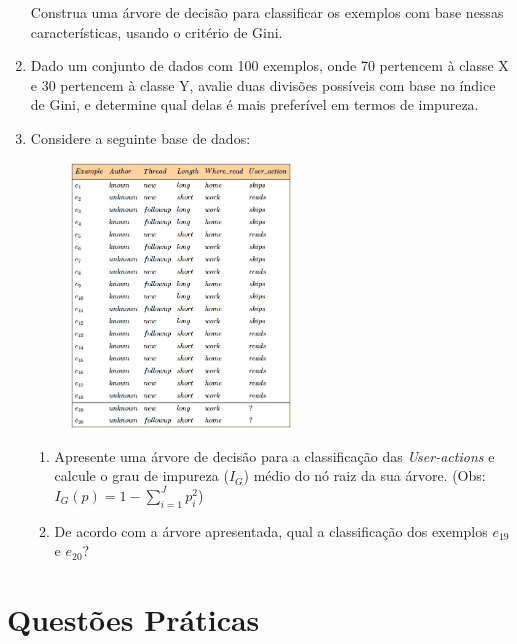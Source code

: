 \documentclass{article}
\begin{document}
\begin{enumerate}
   Construa uma árvore de decisão para classificar os exemplos com base nessas características, usando o critério de Gini.

   \item Dado um conjunto de dados com 100 exemplos, onde 70 pertencem à classe X e 30 pertencem à classe Y, avalie duas divisões possíveis com base no índice de Gini, e determine qual delas é mais preferível em termos de impureza.

   \item Considere a seguinte base de dados:
    
   \begin{figure}[!ht]
        \centering
        \includegraphics[width=0.55\textwidth]{abc.jpg}
   \end{figure}


       \begin{enumerate}
       
       \item Apresente uma árvore de decisão para a classificação das \textit{User-actions} e calcule o grau de impureza ($I_G$) médio do nó raiz da sua árvore. (Obs: $I_G(p) = 1 - \sum_{i=1}^{J}p_i^2$)
           
       \item De acordo com a árvore apresentada, qual a classificação dos exemplos $e_{19}$ e $e_{20}$?  
       
       \end{enumerate}

    \end{enumerate}

    \section{Questões Práticas}
\end{document}
